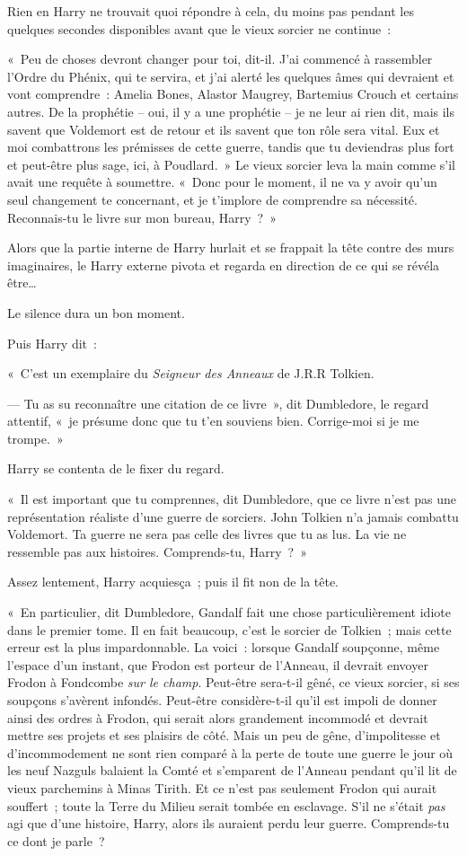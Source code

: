 Rien en Harry ne trouvait quoi répondre à cela, du moins pas pendant les quelques secondes disponibles avant que le vieux sorcier ne continue~:

«~Peu de choses devront changer pour toi, dit-il. J'ai commencé à rassembler l'Ordre du Phénix, qui te servira, et j'ai alerté les quelques âmes qui devraient et vont comprendre~: Amelia Bones, Alastor Maugrey, Bartemius Crouch et certains autres. De la prophétie -- oui, il y a une prophétie -- je ne leur ai rien dit, mais ils savent que Voldemort est de retour et ils savent que ton rôle sera vital. Eux et moi combattrons les prémisses de cette guerre, tandis que tu deviendras plus fort et peut-être plus sage, ici, à Poudlard.~» Le vieux sorcier leva la main comme s'il avait une requête à soumettre. «~Donc pour le moment, il ne va y avoir qu'un seul changement te concernant, et je t'implore de comprendre sa nécessité. Reconnais-tu le livre sur mon bureau, Harry~?~»

Alors que la partie interne de Harry hurlait et se frappait la tête contre des murs imaginaires, le Harry externe pivota et regarda en direction de ce qui se révéla être…

Le silence dura un bon moment.

Puis Harry dit~:

«~C'est un exemplaire du \emph{Seigneur des Anneaux} de J.R.R Tolkien.

--- Tu as su reconnaître une citation de ce livre~», dit Dumbledore, le regard attentif, «~je présume donc que tu t'en souviens bien. Corrige-moi si je me trompe.~»

Harry se contenta de le fixer du regard.

«~Il est important que tu comprennes, dit Dumbledore, que ce livre n'est pas une représentation réaliste d'une guerre de sorciers. John Tolkien n'a jamais combattu Voldemort. Ta guerre ne sera pas celle des livres que tu as lus. La vie ne ressemble pas aux histoires. Comprends-tu, Harry~?~»

Assez lentement, Harry acquiesça~; puis il fit non de la tête.

«~En particulier, dit Dumbledore, Gandalf fait une chose particulièrement idiote dans le premier tome. Il en fait beaucoup, c'est le sorcier de Tolkien~; mais cette erreur est la plus impardonnable. La voici~: lorsque Gandalf soupçonne, même l'espace d'un instant, que Frodon est porteur de l'Anneau, il devrait envoyer Frodon à Fondcombe \emph{sur le champ}. Peut-être sera-t-il gêné, ce vieux sorcier, si ses soupçons s'avèrent infondés. Peut-être considère-t-il qu'il est impoli de donner ainsi des ordres à Frodon, qui serait alors grandement incommodé et devrait mettre ses projets et ses plaisirs de côté. Mais un peu de gêne, d'impolitesse et d'incommodement ne sont rien comparé à la perte de toute une guerre le jour où les neuf Nazguls balaient la Comté et s'emparent de l'Anneau pendant qu'il lit de vieux parchemins à Minas Tirith. Et ce n'est pas seulement Frodon qui aurait souffert~; toute la Terre du Milieu serait tombée en esclavage. S'il ne s'était \emph{pas} agi que d'une histoire, Harry, alors ils auraient perdu leur guerre. Comprends-tu ce dont je parle~?

